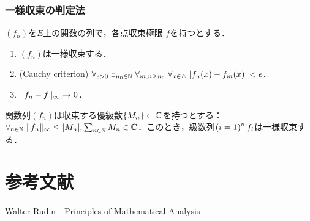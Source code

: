 \documentclass[uplatex, dvipdfmx]{jsreport}
\begin{document}
\subsection{一様収束の判定法}

\begin{proposition}[一様収束の判定法]
    $(f_n)$を$E$上の関数の列で，各点収束極限
    $f$を持つとする．
    \begin{enumerate}
        \item $(f_n)$は一様収束する．
        \item (Cauchy criterion) $\forall_{\epsilon>0}\;\exists_{n_0\in\mathbb{N}}\;\forall_{m,n\ge n_0}\;\forall_{x\in E}\;\lvert f_n(x)-f_m(x)\rvert<\epsilon$．
        \item $\|f_n-f\|_\infty\to0$．
    \end{enumerate}
\end{proposition}

\begin{proposition}
    関数列$(f_n)$は収束する優級数$\{M_n\}\subset\mathbb{C}$を持つとする：$\forall_{n\in\mathbb{N}}\;\|f_n\|_\infty\le\lvert M_n\rvert,\sum_{n\in\mathbb{N}}M_n\in\mathbb{C}$．このとき，級数列$\left(i=1\right)^nf_i$は一様収束する．
\end{proposition}

\chapter{参考文献}

\begin{thebibliography}{9}
    Walter Rudin - Principles of Mathematical Analysis
\end{thebibliography}
\end{document}

